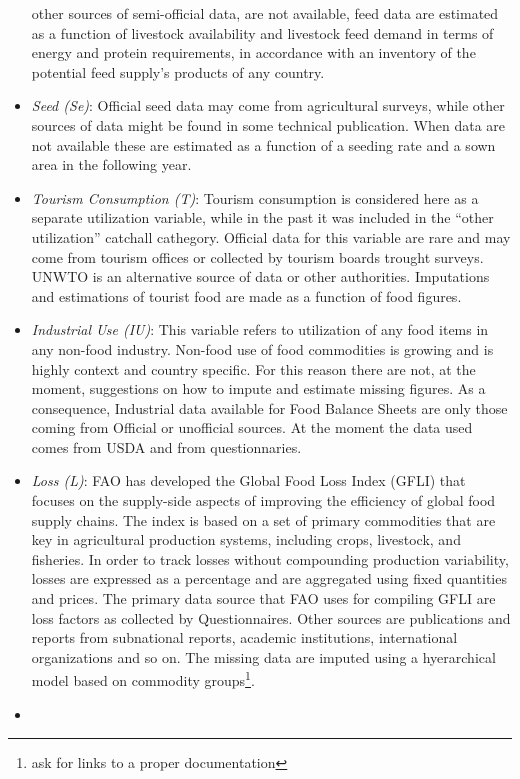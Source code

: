 \documentclass[]{article}
\let\rmarkdownfootnote\footnote%
\def\footnote{\protect\rmarkdownfootnote}
\begin{document}
\begin{itemize}
  other sources of semi-official data, are not available, feed data are
  estimated as a function of livestock availability and livestock feed
  demand in terms of energy and protein requirements, in accordance with
  an inventory of the potential feed supply's products of any country.
\item
  \emph{Seed (Se)}: Official seed data may come from agricultural
  surveys, while other sources of data might be found in some technical
  publication. When data are not available these are estimated as a
  function of a seeding rate and a sown area in the following year.
\item
  \emph{Tourism Consumption (T)}: Tourism consumption is considered here
  as a separate utilization variable, while in the past it was included
  in the ``other utilization'' catchall cathegory. Official data for
  this variable are rare and may come from tourism offices or collected
  by tourism boards trought surveys. UNWTO is an alternative source of
  data or other authorities. Imputations and estimations of tourist food
  are made as a function of food figures.
\item
  \emph{Industrial Use (IU)}: This variable refers to utilization of any
  food items in any non-food industry. Non-food use of food commodities
  is growing and is highly context and country specific. For this reason
  there are not, at the moment, suggestions on how to impute and
  estimate missing figures. As a consequence, Industrial data available
  for Food Balance Sheets are only those coming from Official or
  unofficial sources. At the moment the data used comes from USDA and
  from questionnaries.
\item
  \emph{Loss (L)}: FAO has developed the Global Food Loss Index (GFLI)
  that focuses on the supply-side aspects of improving the efficiency of
  global food supply chains. The index is based on a set of primary
  commodities that are key in agricultural production systems, including
  crops, livestock, and fisheries. In order to track losses without
  compounding production variability, losses are expressed as a
  percentage and are aggregated using fixed quantities and prices. The
  primary data source that FAO uses for compiling GFLI are loss factors
  as collected by Questionnaires. Other sources are publications and
  reports from subnational reports, academic institutions, international
  organizations and so on. The missing data are imputed using a
  hyerarchical model based on commodity groups\footnote{ask for links to
    a proper documentation}.
\item

\end{itemize}
\end{document}
